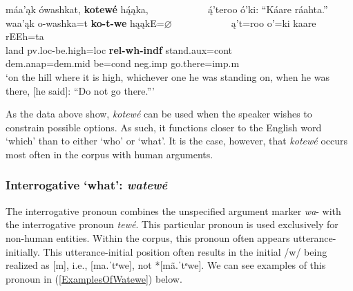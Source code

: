 \begin{exe}
\begin{xlist}
    \item\label{ExamplesOfKotewe5} \glll máa'ąk ówashkat, \textbf{kotewé} hą́ąka, ~ ~ ~ ~ ~ ~ ~  ą́'teroo ó'ki: ``Káare ráahta.''\\
    waa'ąk o-washka=t \textbf{ko-t-we} hąąkE=$\varnothing$ ~ ~ ~ ~ ~ ~ ~   ą't=roo o'=ki kaare rEEh=ta\\
    \textnormal{land} pv.loc-\textnormal{be.high}=loc \textbf{rel-wh-indf} \textnormal{stand}.aux=cont ~ ~ ~ ~ ~ ~ ~ {dem.anap}=dem.mid
 \textnormal{be}=cond neg.imp \textnormal{go.there}=imp.m\\
    \glt `on the hill where it is high, whichever one he was standing on, when he was there, [he said]: ``Do not go there.{''}' \citep[93]{hollow1973a}
    
    \end{xlist}
\end{exe}

As the data above show, \textit{kotewé} can be used when the speaker wishes to constrain possible options. As such, it functions closer to the English word `which' than to either `who' or `what'. It is the case, however, that \textit{kotewé} occurs most often in the corpus with human arguments.

\subsubsection{Interrogative `what': \textit{watewé}}\label{SubSubSectionWatewe}

The interrogative pronoun combines the unspecified argument marker \textit{wa}- with the interrogative pronoun \textit{tewé}. This particular pronoun is used exclusively for non-human entities. Within the corpus, this pronoun often appears utterance-initially. This utterance-initial position often results in the initial /w/ being realized as [m], i.e., [ma.ˈtᵉwe], not *[mã.ˈtᵉwe]. We can see examples of this pronoun in (\ref{ExamplesOfWatewe}) below.


